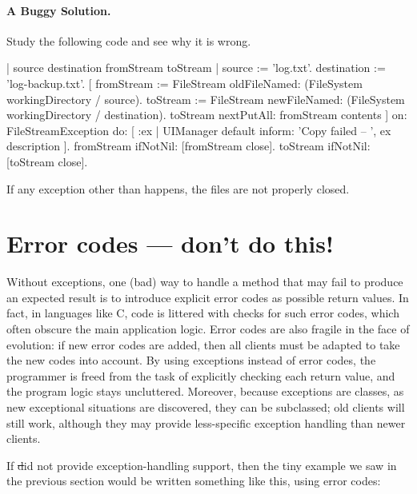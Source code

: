 \paragraph{A Buggy Solution.} Study the following code and see why it is wrong.

\begin{code}{}
| source destination fromStream toStream |
source := 'log.txt'.
destination := 'log-backup.txt'.
	[ fromStream := FileStream oldFileNamed: (FileSystem workingDirectory / source).
	toStream := FileStream newFileNamed: (FileSystem workingDirectory / destination). 
	toStream nextPutAll: fromStream contents ]
		on: FileStreamException
		do: [ :ex | UIManager default inform: 'Copy failed -- ', ex description ].
	fromStream ifNotNil: [fromStream close].
	toStream ifNotNil: [toStream close].
\end{code}

If any exception other than  happens, the files are not properly closed. 


\section{Error codes --- don't  do this!}

Without exceptions, one (bad) way to handle a method that may fail to produce an expected result is to introduce explicit error codes as possible return values. In fact, in languages like C, code is littered with checks for such error codes, which often obscure the main application logic.
Error codes are also fragile in the face of evolution: if new error codes are added, then all clients must be adapted to take the new codes into account. By using exceptions instead of error codes, the programmer is freed from the task of explicitly checking each return value, and the program logic stays uncluttered.
Moreover, because exceptions are classes, as new exceptional situations are discovered, they can be subclassed; old clients will still work, although they may provide less-specific exception handling than newer clients.

If \st did not provide exception-handling support, then the tiny example we saw in the previous section would be written something like this, using error codes:

